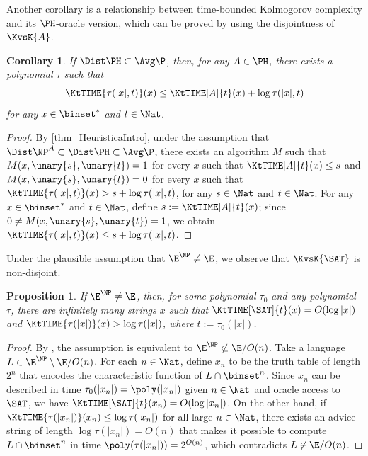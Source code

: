 \documentclass[11pt]{article}
\numberwithin{equation}{section}
\newtheorem{proposition}[theorem]{Proposition}
\newtheorem{corollary}[theorem]{Corollary}
\theoremstyle{definition}
\theoremstyle{plain}
\begin{document}
Another corollary is
a relationship between time-bounded Kolmogorov complexity
and its $\PH$-oracle version,
which can be proved by using the disjointness of $\KvsK{A}$.
\begin{corollary}
  \label{cor:oracle elimination}
  If $\Dist\PH \subset \Avg\P$,
  then,
  for any $A \in \PH$,
  there exists a polynomial $\tau$ such that
  $$\KtTIME{\tau(|x|, t)}(x) \le \KtTIME[A]{t}(x) + \log \tau(|x|, t)$$
  for any $x \in \binset^*$ and $t \in \Nat$.
\end{corollary}
\begin{proof}
  By \cref{thm_HeuristicaIntro},
  under the assumption that $\Dist\NP^A \subset \Dist\PH \subset \Avg\P$,
  there exists an algorithm $M$ such that
  $M(x, \unary{s}, \unary{t}) = 1$ for every $x$ such that $\KtTIME[A]{t}(x) \le s$
  and
  $M(x, \unary{s}, \unary{t}) = 0$ for every $x$ such that $\KtTIME{\tau(|x|, t)}(x) > s + \log \tau(|x|, t)$,
  for any $s \in \Nat$ and $t \in \Nat$.
  For any $x \in \binset^*$ and $t \in \Nat$, define $s := \KtTIME[A]{t}(x)$;
  since $0 \neq M(x, \unary{s}, \unary{t}) = 1$, we obtain
  $\KtTIME{\tau(|x|, t)}(x) \le s + \log \tau(|x|, t)$.
\end{proof}


%
Under the plausible assumption that $\E^\NP \neq \E$,
we observe that $\KvsK{\SAT}$ is non-disjoint.
\begin{proposition}
  \label{prop_NondisjointKSATvsK}
  If $\E^\NP \neq \E$,
  then,
  for some polynomial $\tau_0$ and any polynomial $\tau$,
  there are infinitely many strings $x$
  such that
  $\KtTIME[\SAT]{t}(x) = O(\log |x|)$
  and
  $\KtTIME{\tau(|x|)}(x) > \log \tau(|x|)$,
  where $t := \tau_0(|x|)$.
\end{proposition}
\begin{proof}
  By \cite{BuhrmanH92_fsttcs_conf}, the assumption is equivalent to $\E^\NP \not\subset \E/O(n)$.
  Take a language $L \in \E^\NP \setminus \E/O(n)$.
  For each $n \in \Nat$,
  define $x_n$ to be the truth table of length $2^n$ that encodes the characteristic function of $L \cap \binset^n$.
  Since $x_n$ can be described in time $\tau_0(|x_n|) = \poly(|x_n|)$ given $n \in \Nat$ and oracle access to $\SAT$,
  we have $\KtTIME[\SAT]{t}(x_n) = O(\log |x_n|)$.
  On the other hand, if $\KtTIME{\tau(|x_n|)}(x_n) \le \log \tau(|x_n|)$ for all large $n \in \Nat$,
  there exists an advice string of length $\log \tau(|x_n|) = O(n)$ that
  makes it possible
  to compute $L \cap \binset^n$ in time $\poly(\tau(|x_n|)) = 2^{O(n)}$,
  which contradicts $L \not\in \E/O(n)$.
\end{proof}
\end{document}
